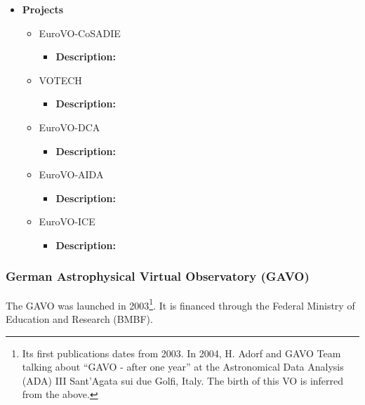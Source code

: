 \begin{itemize}
\item \textbf{Projects}
\begin{itemize}
\item EuroVO-CoSADIE
\begin{itemize}
\item \textbf{Description:}
\end{itemize}
\item VOTECH
\begin{itemize}
\item \textbf{Description:}
\end{itemize}
\item EuroVO-DCA
\begin{itemize}
\item \textbf{Description:}
\end{itemize}
\item EuroVO-AIDA
\begin{itemize}
\item \textbf{Description:}
\end{itemize}
\item EuroVO-ICE
\begin{itemize}
\item \textbf{Description:}
\end{itemize}
\end{itemize}
\end{itemize}

\subsubsection{German Astrophysical Virtual Observatory (GAVO)}
The GAVO was launched in 2003\footnote{Its first publications dates from 2003.
In 2004, H. Adorf and GAVO Team talking about ``GAVO - after one year'' at the
Astronomical Data Analysis (ADA) III Sant'Agata sui due Golfi, Italy. The birth
of this VO is inferred from the above.}. It is financed through the Federal
Ministry of Education and Research (BMBF).

